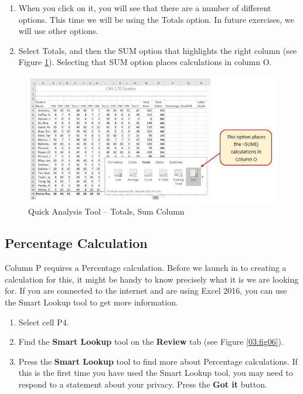 \begin{enumerate}[resume]
	\item When you click on it, you will see that there are a number of different options. This time we will be using the Totals option. In future exercises, we will use other options.
	\item Select Totals, and then the SUM option that highlights the right column (see Figure \ref{03:fig05}). Selecting that SUM option places  calculations in column O.
\end{enumerate}

\begin{figure}[H]
	\centering
	\includegraphics[width=\maxwidth{.95\linewidth}]{gfx/ch03_fig05}
	\caption{Quick Analysis Tool – Totals, Sum Column}
	\label{03:fig05}
\end{figure}

\subsection{Percentage Calculation}

Column P requires a Percentage calculation. Before we launch in to creating a calculation for this, it might be handy to know precisely what it is we are looking for. If you are connected to the internet and are using Excel 2016, you can use the Smart Lookup tool to get more information.

\begin{enumerate}
	\item Select cell \textsf{P4}.
	\item Find the \textbf{Smart Lookup} tool on the \textbf{Review} tab (see Figure \ref{03:fig06}).
	\item Press the \textbf{Smart Lookup} tool to find more about Percentage calculations. If this is the first time you have used the Smart Lookup tool, you may need to respond to a statement about your privacy. Press the \textbf{Got it} button.
\end{enumerate}

